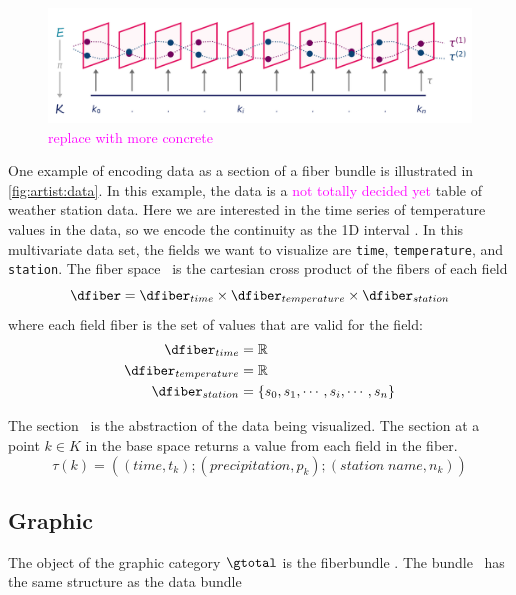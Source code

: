 \documentclass[10pt,journal,compsoc]{IEEEtran}
\newcommand{\note}[1]{\textcolor{magenta}{#1}}
\theoremstyle{definition}
\theoremstyle{remark}
\begin{document}
\begin{figure}[h!]
  \includegraphics[width=\columnwidth]{fiberbundle.png}
  \caption{\note{replace with more concrete}}
  \label{fig:artist:data}
\end{figure}

One example of encoding data as a section of a fiber bundle is illustrated in \autoref{fig:artist:data}. In this example, the data is a \note{not totally decided yet} table of weather station data. Here we are interested in the time series of temperature values in the data, so we encode the continuity as the 1D interval \dbase. In this multivariate data set, the fields we want to visualize are \texttt{time}, \texttt{temperature}, and \texttt{station}. The fiber space \dfiber\ is the cartesian cross product of the fibers of each field
\begin{equation*}
  \dfiber = \dfiber_{time} \times \dfiber_{temperature} \times \dfiber_{station}
\end{equation*}
where each field fiber is the set of values that are valid for the field: 
\begin{align*}
  \dfiber_{time} &= \mathbb{R} \\
  \dfiber_{temperature} &= \mathbb{R}\\
  \dfiber_{station} &= \{s_0, s_1, \cdots, s_i, \cdots, s_n\} 
\end{align*}

The section \dsection\ is the abstraction of the data being visualized. The section at a point $k \in K$ in the base space returns a value from each field in the fiber.
\begin{equation*}
  \tau(k) = ((time, t_k); (precipitation, p_k); (station\;name, n_k))
\end{equation*}


\subsection{Graphic} 
The object of the graphic category $\mathcal{\gtotal}$ is the fiberbundle \gtotal. The bundle \gtotal\ has the same structure as the data bundle \dtotal
\end{document}
